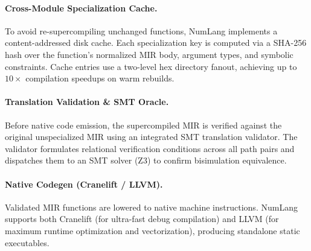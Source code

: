 \paragraph{Cross-Module Specialization Cache.}
To avoid re-supercompiling unchanged functions, NumLang implements a content-addressed disk cache. Each specialization key is computed via a SHA-256 hash over the function's normalized MIR body, argument types, and symbolic constraints. Cache entries use a two-level hex directory fanout, achieving up to $10\times$ compilation speedups on warm rebuilds.

\paragraph{Translation Validation \& SMT Oracle.}
Before native code emission, the supercompiled MIR is verified against the original unspecialized MIR using an integrated SMT translation validator. The validator formulates relational verification conditions across all path pairs and dispatches them to an SMT solver (Z3) to confirm bisimulation equivalence.

\paragraph{Native Codegen (Cranelift / LLVM).}
Validated MIR functions are lowered to native machine instructions. NumLang supports both Cranelift (for ultra-fast debug compilation) and LLVM (for maximum runtime optimization and vectorization), producing standalone static executables.
